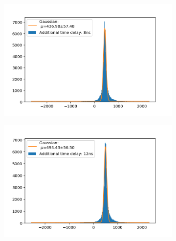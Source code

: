 \documentclass[]{article}
\begin{document}
\begin{figure}[H]
\medskip
\begin{subfigure}{0.48\textwidth}
\includegraphics[width=\linewidth]{Plots/Time/8ns.png}
\end{subfigure}
\begin{subfigure}[c]{0.48\linewidth}
\includegraphics[width=\linewidth]{Plots/Time/12ns.png}
\end{subfigure}


\end{figure}
\end{document}
